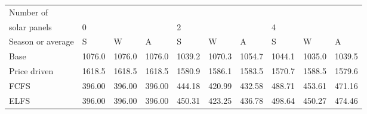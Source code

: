 \begin{table}[h] 
\centering 
\begin{tabular}{l|lll|lll|lll}Number of \\ solar panels&0& & &2& & &4& & \\ \hline 
Season or average & S & W & A & S & W & A & S & W & A \\ \hline 
Base&1076.0&1076.0&1076.0&1039.2&1070.3&1054.7&1044.1&1035.0&1039.5 \\ 
Price driven&1618.5&1618.5&1618.5&1580.9&1586.1&1583.5&1570.7&1588.5&1579.6 \\ 
FCFS&396.00&396.00&396.00&444.18&420.99&432.58&488.71&453.61&471.16 \\ 
ELFS&396.00&396.00&396.00&450.31&423.25&436.78&498.64&450.27&474.46 \\ 
\end{tabular} 
\end{table}